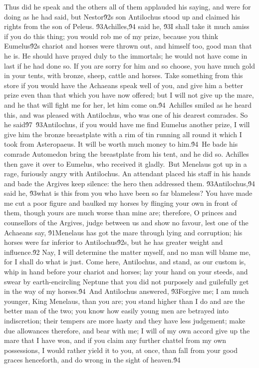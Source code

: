 {Thus did he speak and the others all of them applauded his saying, and were for doing as he had said, but Nestor\'92s son Antilochus stood up and claimed his rights from the son of Peleus. \'93Achilles,\'94 said he, \'93I shall take it much amiss if you do this thing; you would rob me of my prize, because you think Eumelus\'92s chariot and horses were thrown out, and himself too, good man that he is. He should have prayed duly to the immortals; he would not have come in last if he had done so. If you are sorry for him and so choose, you have much gold in your tents, with bronze, sheep, cattle and horses. Take something from this store if you would have the Achaeans speak well of you, and give him a better prize even than that which you have now offered; but I will not give up the mare, and he that will fight me for her, let him come on.\'94\
Achilles smiled as he heard this, and was pleased with Antilochus, who was one of his dearest comrades. So he said\'97\
\'93Antilochus, if you would have me find Eumelus another prize, I will give him the bronze breastplate with a rim of tin running all round it which I took from Asteropaeus. It will be worth much money to him.\'94\
He bade his comrade Automedon bring the breastplate from his tent, and he did so. Achilles then gave it over to Eumelus, who received it gladly.\
But Menelaus got up in a rage, furiously angry with Antilochus. An attendant placed his staff in his hands and bade the Argives keep silence: the hero then addressed them. \'93Antilochus,\'94 said he, \'93what is this from you who have been so far blameless? You have made me cut a poor figure and baulked my horses by flinging your own in front of them, though yours are much worse than mine are; therefore, O princes and counsellors of the Argives, judge between us and show no favour, lest one of the Achaeans say, \'91Menelaus has got the mare through lying and corruption; his horses were far inferior to Antilochus\'92s, but he has greater weight and influence.\'92 Nay, I will determine the matter myself, and no man will blame me, for I shall do what is just. Come here, Antilochus, and stand, as our custom is, whip in hand before your chariot and horses; lay your hand on your steeds, and swear by earth-encircling Neptune that you did not purposely and guilefully get in the way of my horses.\'94\
And Antilochus answered, \'93Forgive me; I am much younger, King Menelaus, than you are; you stand higher than I do and are the better man of the two; you know how easily young men are betrayed into indiscretion; their tempers are more hasty and they have less judgement; make due allowances therefore, and bear with me; I will of my own accord give up the mare that I have won, and if you claim any further chattel from my own possessions, I would rather yield it to you, at once, than fall from your good graces henceforth, and do wrong in the sight of heaven.\'94\
}
